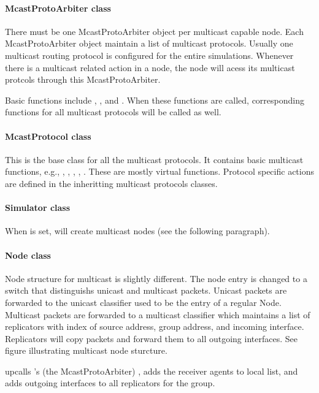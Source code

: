 \paragraph{McastProtoArbiter class}
There must be one McastProtoArbiter object per multicast capable node.  Each  McastProtoArbiter object maintain a list of multicast protocols.  Usually one multicast routing protocol is configured for the entire simulations.  Whenever there is a multicast related action in a node, the node will acess its multicast protcols through this McastProtoArbiter.

Basic functions include , , and .  When these functions are called, corresponding functions for all multicast protocols will be called as well.

\paragraph{McastProtocol class}
This is the base class for all the multicast protocols.  It contains basic multicast functions, e.g., , , , , .  These are mostly virtual functions.  Protocol specific actions are defined in the inheritting multicast protocols classes.

\paragraph{Simulator class}
When  is set,  will create multicast nodes (see the following paragraph).

\paragraph{Node class}
Node structure for multicast is slightly different.  The node entry is changed to a switch that distinguishs unicast and multicast packets.  Unicast packets are forwarded to the unicast classifier used to be the entry of a regular Node.  Multicast packets are forwarded to a multicast classifier which maintains a list of replicators with index of source address, group address, and incoming interface. Replicators will copy packets and forward them to all outgoing interfaces. See figure illustrating multicast node sturcture.

 upcalls 's (the McastProtoArbiter) , adds the receiver agents to local  list, and adds outgoing interfaces to all replicators for the group.

